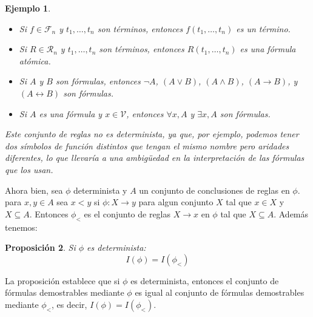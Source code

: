 \documentclass[executivepaper]{article}
\newtheorem{propo}{Proposición}[section]
\newtheorem{ejemplo}[propo]{Ejemplo}
\begin{document}
\begin{ejemplo}
\begin{itemize}
\begin{itemize}
            \item Si $f \in \mathcal{F}_n$ y $t_1,\ldots,t_n$ son términos, entonces $f(t_1,\ldots,t_n)$ es un término.
            \item Si $R \in \mathcal{R}_n$ y $t_1,\ldots,t_n$ son términos, entonces $R(t_1,\ldots,t_n)$ es una fórmula atómica.
            \item Si $A$ y $B$ son fórmulas, entonces $\neg A$, $(A \vee B)$, $(A \wedge B)$, $(A \rightarrow B)$, y $(A \leftrightarrow B)$ son fórmulas.
            \item Si $A$ es una fórmula y $x \in \mathcal{V}$, entonces $\forall x,A$ y $\exists x,A$ son fórmulas.
        \end{itemize}
        Este conjunto de reglas no es determinista, ya que, por ejemplo, podemos tener dos símbolos de función distintos que tengan el mismo nombre pero aridades diferentes, lo que llevaría a una ambigüedad en la interpretación de las fórmulas que los usan.
    \end{itemize}
\end{ejemplo}

Ahora bien, sea $\phi$ determinista y $A$ un conjunto de conclusiones de reglas en $\phi$. para $x,y\in A$ sea $x<y$ si $\phi: X\rightarrow y$ para algun conjunto $X$ tal que $x\in X$ y $X\subseteq A$. Entonces $\phi_<$ es el conjunto de reglas $X\rightarrow x$ en $\phi$ tal que $X\subseteq A$. Además tenemos:
\begin{propo}
    Si $\phi$ es determinista:
    $$I(\phi)=I(\phi_<)$$
\end{propo}
La proposición establece que si $\phi$ es determinista, entonces el conjunto de fórmulas demostrables mediante $\phi$ es igual al conjunto de fórmulas demostrables mediante $\phi_<$, es decir, $I(\phi) = I(\phi_<)$.
\end{document}
